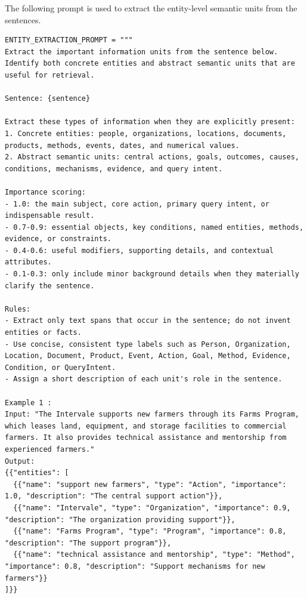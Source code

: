 \documentclass{article} %
\begin{document}
The following prompt is used to extract the entity-level semantic units from the sentences.
\begin{lstlisting}
ENTITY_EXTRACTION_PROMPT = """
Extract the important information units from the sentence below. Identify both concrete entities and abstract semantic units that are useful for retrieval.

Sentence: {sentence}

Extract these types of information when they are explicitly present:
1. Concrete entities: people, organizations, locations, documents, products, methods, events, dates, and numerical values.
2. Abstract semantic units: central actions, goals, outcomes, causes, conditions, mechanisms, evidence, and query intent.

Importance scoring:
- 1.0: the main subject, core action, primary query intent, or indispensable result.
- 0.7-0.9: essential objects, key conditions, named entities, methods, evidence, or constraints.
- 0.4-0.6: useful modifiers, supporting details, and contextual attributes.
- 0.1-0.3: only include minor background details when they materially clarify the sentence.

Rules:
- Extract only text spans that occur in the sentence; do not invent entities or facts.
- Use concise, consistent type labels such as Person, Organization, Location, Document, Product, Event, Action, Goal, Method, Evidence, Condition, or QueryIntent.
- Assign a short description of each unit's role in the sentence.

Example 1 :
Input: "The Intervale supports new farmers through its Farms Program, which leases land, equipment, and storage facilities to commercial farmers. It also provides technical assistance and mentorship from experienced farmers."
Output:
{{"entities": [
  {{"name": "support new farmers", "type": "Action", "importance": 1.0, "description": "The central support action"}},
  {{"name": "Intervale", "type": "Organization", "importance": 0.9, "description": "The organization providing support"}},
  {{"name": "Farms Program", "type": "Program", "importance": 0.8, "description": "The support program"}},
  {{"name": "technical assistance and mentorship", "type": "Method", "importance": 0.8, "description": "Support mechanisms for new farmers"}}
]}}


\end{lstlisting}
\end{document}
